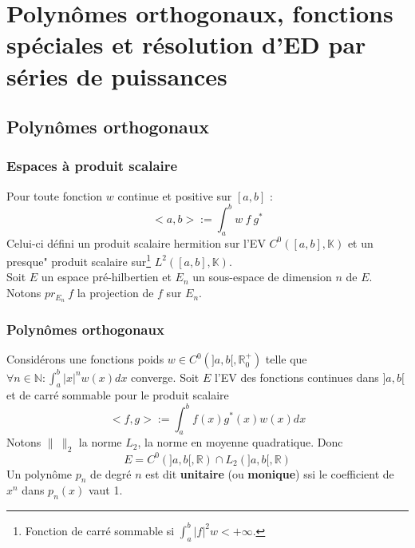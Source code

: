 \chapter{Polynômes orthogonaux, fonctions spéciales et résolution d'ED 
par séries de puissances}

\setcounter{section}{16}
\section{Polynômes orthogonaux}
	\setcounter{subsection}{1}
	\subsection{Espaces à produit scalaire}
	Pour toute fonction $w$ continue et positive sur $[a,b]$ :
	\begin{equation}
	<a,b> := \int_a^b w\ f\ g^*
	\end{equation}
	Celui-ci défini un produit scalaire hermition sur l'EV $C^0([a,b], 
	\mathbb{K})$ et un presque" produit scalaire sur\footnote{Fonction de 
	carré sommable si $\int_a^b |f|^2 w < +\infty$.} $L^2([a,b],\mathbb{
	K})$.\\
	
	Soit $E$ un espace pré-hilbertien et $E_n$ un sous-espace de dimension 
	$n$ de $E$. Notons $pr_{E_n}\ f$ la projection de $f$ sur $E_n$.

	
	
	\subsection{Polynômes orthogonaux}
	Considérons une fonctions poids $w \in C^0(]a,b[,\mathbb{R}_0^+)$ 
	telle que $\forall n \in \mathbb{N} : \int_a^b |x|^n w(x)dx$ converge. 
	Soit $E$ l'EV des fonctions continues dans $]a,b[$ et de carré sommable 
	pour le produit scalaire
	\begin{equation}
	<f,g> := \int_a^b f(x)g^*(x)w(x)dx
	\end{equation}
	Notons $\|\ \|_2$ la norme $L_2$, la norme en moyenne quadratique. Donc 
	\begin{equation}
	E = C^0(]a,b[,\mathbb{R})\cap L_2(]a,b[, \mathbb{R})
	\end{equation}
	Un polynôme $p_n$ de degré $n$ est dit \textbf{unitaire} (ou \textbf{
	monique}) ssi le coefficient de $x^n$ dans $p_n(x)$ vaut 1.\\
	
